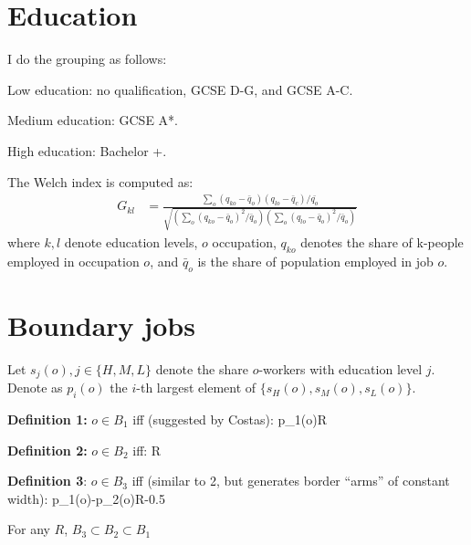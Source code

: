 \documentclass[a4paper, 12pt]{article}
\begin{document}
	\section{Education}
%	
	\bitem
	\item I do the grouping as follows:
	\bitem 
	\item Low education: no qualification,  GCSE D-G, and  GCSE A-C.
	\item Medium education:  GCSE A*.
	\item High education: Bachelor +.
	\eitem
	
	\item The Welch index is computed as:
		\begin{align*}
		G_{kl}&=\frac{\sum_o(q_{ko}-\bar{q}_{o})(q_{lo}-\bar{q}_{c})/\bar{q_o}}{\sqrt{(\sum_o(q_{ko}-\bar{q}_o)^2/\bar{q}_o)(\sum_o(q_{lo}-\bar{q}_o)^2/\bar{q}_o)}}
		\end{align*}
	where $k,l$ denote education levels, $o$ occupation, $q_{ko}$ denotes the share of k-people employed in occupation $o$, and $\bar{q}_o$ is the share of population employed in job $o$.
	\eitem
	
	
	
	

	\section{Boundary jobs}
	Let $s_{j}(o), j\in\{H,M,L\}$ denote the share $o$-workers with education level $j$. Denote as $p_i(o)$ the $i$-th largest element of $\{s_H(o),s_M(o),s_L(o)\}$.
	\bitem
	\item \textbf{Definition 1:} $o\in B_1$ iff (suggested by Costas):
	\beqns
	p_1(o)\leq R
	\eeqns
	\item \textbf{Definition 2:} $o\in B_2$ iff:
	\beqns
	\leq R
	\eeqns
	\item \textbf{Definition 3}: $o\in B_3$ iff (similar to 2, but generates border ``arms'' of constant width):
	\beqns
	p_1(o)-p_2(o)\leq R-0.5
	\eeqns
	\item For any $R$, $B_3\subset B_2\subset B_1$
	\eitem
	
\end{document}
